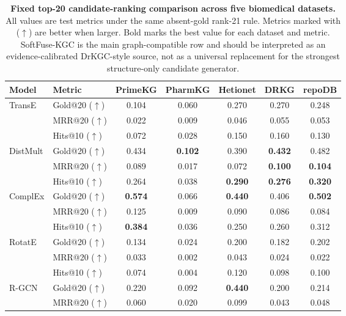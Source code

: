 \documentclass[pdflatex,sn-mathphys-num]{sn-jnl}
\newcommand{\softfuse}{SoftFuse-KGC}
\newcommand{\drkgc}{DrKGC}
\begin{document}
\begin{table}[!t]
\caption{\textbf{Fixed top-20 candidate-ranking comparison across five biomedical datasets.} All values are test metrics under the same absent-gold rank-21 rule. Metrics marked with ($\uparrow$) are better when larger. Bold marks the best value for each dataset and metric. \softfuse{} is the main graph-compatible row and should be interpreted as an evidence-calibrated \drkgc{}-style source, not as a universal replacement for the strongest structure-only candidate generator.}
\label{tab:candidate_baselines}
\centering
{\fontsize{8.1pt}{8.9pt}\selectfont
\setlength{\tabcolsep}{2.8pt}
\renewcommand{\arraystretch}{1.07}
\begin{tabular*}{\textwidth}{@{\extracolsep{\fill}}llccccc@{}}
\toprule
Model & Metric & PrimeKG & PharmKG & Hetionet & DRKG & repoDB \\
\midrule
\multirow{3}{*}{TransE}
& Gold@20 ($\uparrow$) & 0.104 & 0.060 & 0.270 & 0.270 & 0.248 \\
& MRR@20 ($\uparrow$) & 0.022 & 0.009 & 0.046 & 0.055 & 0.053 \\
& Hits@10 ($\uparrow$) & 0.072 & 0.028 & 0.150 & 0.160 & 0.130 \\
\midrule
\multirow{3}{*}{DistMult}
& Gold@20 ($\uparrow$) & 0.434 & \textbf{0.102} & 0.390 & \textbf{0.432} & 0.482 \\
& MRR@20 ($\uparrow$) & 0.089 & 0.017 & 0.072 & \textbf{0.100} & \textbf{0.104} \\
& Hits@10 ($\uparrow$) & 0.264 & 0.038 & \textbf{0.290} & \textbf{0.276} & \textbf{0.320} \\
\midrule
\multirow{3}{*}{ComplEx}
& Gold@20 ($\uparrow$) & \textbf{0.574} & 0.066 & \textbf{0.440} & 0.406 & \textbf{0.502} \\
& MRR@20 ($\uparrow$) & 0.125 & 0.009 & 0.090 & 0.086 & 0.084 \\
& Hits@10 ($\uparrow$) & \textbf{0.384} & 0.036 & 0.250 & 0.260 & 0.312 \\
\midrule
\multirow{3}{*}{RotatE}
& Gold@20 ($\uparrow$) & 0.134 & 0.024 & 0.200 & 0.182 & 0.202 \\
& MRR@20 ($\uparrow$) & 0.033 & 0.002 & 0.043 & 0.024 & 0.022 \\
& Hits@10 ($\uparrow$) & 0.074 & 0.004 & 0.120 & 0.098 & 0.100 \\
\midrule
\multirow{3}{*}{R-GCN}
& Gold@20 ($\uparrow$) & 0.220 & 0.092 & \textbf{0.440} & 0.200 & 0.214 \\
& MRR@20 ($\uparrow$) & 0.060 & 0.020 & 0.099 & 0.043 & 0.048 \\

\end{tabular*}}
\end{table}
\end{document}
